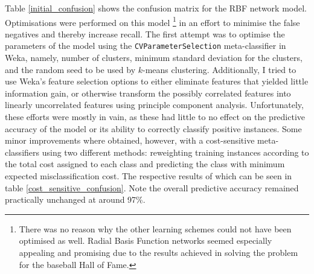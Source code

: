 \documentclass[paper=a4, fontsize=11pt]{scrartcl} %
\numberwithin{equation}{section} %
\numberwithin{figure}{section} %
\numberwithin{table}{section} %
\begin{document}
Table \ref{initial_confusion} shows the confusion matrix for the RBF network model. Optimisations were performed on this model \footnote{There was no reason why the other learning schemes could not have been optimised as well. Radial Basis Function networks seemed especially appealing and promising due to the results achieved in solving the problem for the baseball Hall of Fame.} in an effort to minimise the false negatives and thereby increase recall. The first attempt was to optimise the parameters of the model using the \texttt{CVParameterSelection} meta-classifier in Weka, namely, number of clusters, minimum standard deviation for the clusters, and the random seed to be used by $k$-means clustering. Additionally, I tried to use Weka's feature selection options to either eliminate features that yielded little information gain, or otherwise transform the possibly correlated features into linearly uncorrelated features using principle component analysis. Unfortunately, these efforts were mostly in vain, as these had little to no effect on the predictive accuracy of the model or its ability to correctly classify positive instances. Some minor improvements where obtained, however, with a cost-sensitive meta-classifiers using two different methods: reweighting training instances according to the total cost assigned to each class and predicting the class with minimum expected misclassification cost\cite{weka_cost}. The respective results of which can be seen in table \ref{cost_sensitive_confusion}. Note the overall predictive accuracy remained practically unchanged at around 97\%.
\end{document}
